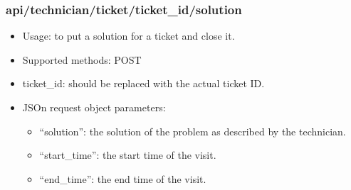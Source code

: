 	\subsubsection{api/technician/ticket/ticket\_id/solution}
		\begin{itemize}
			\item Usage: to put a solution for a ticket and close it.
			\item Supported methods: POST
			\item ticket\_id: should be replaced with the actual ticket ID.
			\item JSOn request object parameters: \begin{itemize}
				\item ``solution'': the solution of the problem as described by the technician.
				\item ``start\_time'': the start time of the visit.
				\item ``end\_time'': the end time of the visit.
			\end{itemize}
		\end{itemize}